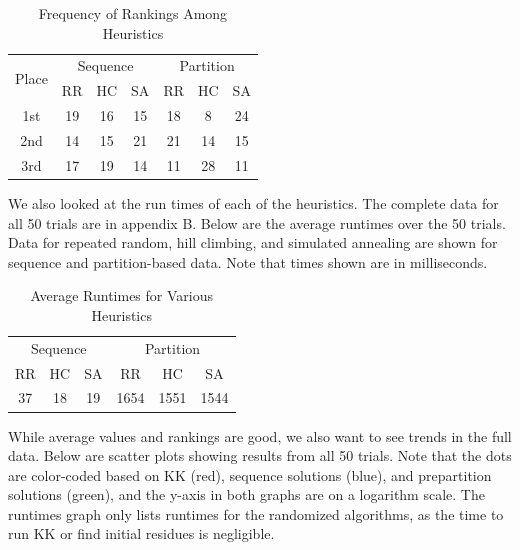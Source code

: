 \documentclass[12pt]{article}
\begin{document}
\begin{table}[h]
\setlength{\tabcolsep}{20pt}
\begin{center}
\begin{tabular}{c | c c c | c c c}
\multirow{2}{*}{Place} & \multicolumn{3}{c|}{Sequence} & \multicolumn{3}{c}{Partition} \\
& RR & HC & SA & RR & HC & SA \\ \hline
1st & 19 & 16 & 15 & 18 & 8 & 24 \\
2nd & 14 & 15 & 21 & 21 & 14 & 15 \\
3rd & 17 & 19 & 14 & 11 & 28 & 11 \\
\end{tabular}
\caption{Frequency of Rankings Among Heuristics}
\end{center}
\end{table}

We also looked at the run times of each of the heuristics. The complete data for all 50 trials are in appendix B. Below are the average runtimes over the 50 trials. Data for repeated random, hill climbing, and simulated annealing are shown for sequence and partition-based data. Note that times shown are in milliseconds.

\begin{table}[h]
\renewcommand{\arraystretch}{1.3}
\setlength{\tabcolsep}{20pt}
\begin{center}
\begin{tabular}{c c c | c c c}
\multicolumn{3}{c|}{Sequence} & \multicolumn{3}{c}{Partition} \\
RR & HC & SA & RR & HC & SA \\ \hline
37 & 18 & 19 & 1654 & 1551 & 1544 \\
\end{tabular}
\caption{Average Runtimes for Various Heuristics}
\end{center}
\end{table}

While average values and rankings are good, we also want to see trends in the full data. Below are scatter plots showing results from all 50 trials. Note that the dots are color-coded based on KK (red), sequence solutions (blue), and prepartition solutions (green), and the y-axis in both graphs are on a logarithm scale. The runtimes graph only lists runtimes for the randomized algorithms, as the time to run KK or find initial residues is negligible.
\end{document}
